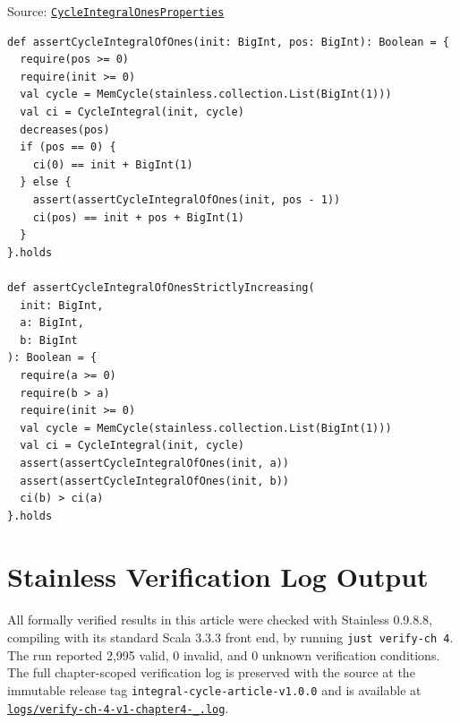 {\raggedright Source: \href{https://github.com/thiagomata/prime-numbers/blob/integral-cycle-article-v1.0.0/src/main/scala/v1/chapter4/cycle/integral/recursive/properties/CycleIntegralOnesProperties.scala}{\texttt{Cycle\allowbreak Integral\allowbreak Ones\allowbreak Properties}}\par}

\begin{lstlisting}[style=scala]
def assertCycleIntegralOfOnes(init: BigInt, pos: BigInt): Boolean = {
  require(pos >= 0)
  require(init >= 0)
  val cycle = MemCycle(stainless.collection.List(BigInt(1)))
  val ci = CycleIntegral(init, cycle)
  decreases(pos)
  if (pos == 0) {
    ci(0) == init + BigInt(1)
  } else {
    assert(assertCycleIntegralOfOnes(init, pos - 1))
    ci(pos) == init + pos + BigInt(1)
  }
}.holds

def assertCycleIntegralOfOnesStrictlyIncreasing(
  init: BigInt,
  a: BigInt,
  b: BigInt
): Boolean = {
  require(a >= 0)
  require(b > a)
  require(init >= 0)
  val cycle = MemCycle(stainless.collection.List(BigInt(1)))
  val ci = CycleIntegral(init, cycle)
  assert(assertCycleIntegralOfOnes(init, a))
  assert(assertCycleIntegralOfOnes(init, b))
  ci(b) > ci(a)
}.holds
\end{lstlisting}

\section{Stainless Verification Log Output}
\label{sec:appendix-b}

All formally verified results in this article were checked with Stainless
0.9.8.8, compiling with its standard Scala 3.3.3 front end, by running
\texttt{just verify-ch 4}. The run reported 2,995 valid, 0 invalid, and 0
unknown verification conditions. The full chapter-scoped verification log is
preserved with the source at the immutable release tag
\texttt{integral-cycle-article-v1.0.0} and is available at
\href{https://github.com/thiagomata/prime-numbers/blob/integral-cycle-article-v1.0.0/logs/verify-ch-4-v1-chapter4-_.log}{\texttt{logs/verify-ch-4-v1-chapter4-\_.log}}.

